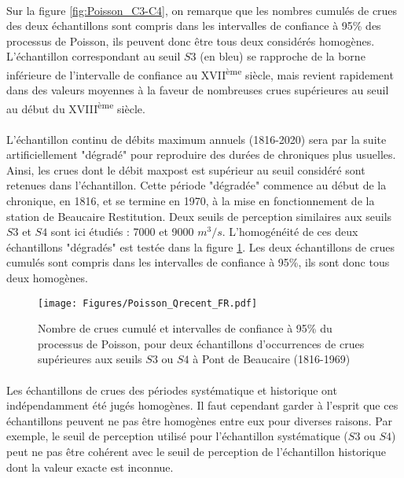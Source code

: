 \documentclass[11pt]{article}
\begin{document}
	\paragraph{} Sur la figure \ref{fig:Poisson_C3-C4}, on remarque que les nombres cumulés de crues des deux échantillons sont compris dans les intervalles de confiance à 95\% des processus de Poisson, ils peuvent donc être tous deux considérés homogènes. L'échantillon correspondant au seuil $S3$ (en bleu) se rapproche de la borne inférieure de l'intervalle de confiance au XVII\textsuperscript{ème} siècle, mais revient rapidement dans des valeurs moyennes à la faveur de nombreuses crues supérieures au seuil au début du XVIII\textsuperscript{ème} siècle. 
	
	\paragraph{} L'échantillon continu de débits maximum annuels (1816-2020) sera par la suite artificiellement "dégradé" pour reproduire des durées de chroniques plus usuelles. Ainsi, les crues dont le débit maxpost est supérieur au seuil considéré sont retenues dans l'échantillon. Cette période "dégradée" commence au début de la chronique, en 1816, et se termine en 1970, à la mise en fonctionnement de la station de Beaucaire Restitution. Deux seuils de perception similaires aux seuils $S3$ et $S4$ sont ici étudiés : 7000 et 9000 $m^3/s$. L'homogénéité de ces deux échantillons "dégradés" est testée dans la figure \ref{fig:Poisson_Recent}. Les deux échantillons de crues cumulés sont compris dans les intervalles de confiance à 95\%, ils sont donc tous deux homogènes. 
	
	\begin{figure}[h]
		\centering
		\texttt{[image: Figures/Poisson\_Qrecent\_FR.pdf]}	
		\caption{Nombre de crues cumulé et intervalles de confiance à 95\% du processus de 						Poisson, pour deux échantillons d'occurrences de crues supérieures aux seuils $S3$ ou $S4$ à Pont de Beaucaire 							(1816-1969) }
		\label{fig:Poisson_Recent}
	\end{figure}
	
	
	\paragraph{} Les échantillons de crues des périodes systématique et historique ont indépendamment été jugés homogènes. Il faut cependant garder à l'esprit que ces échantillons peuvent ne pas être homogènes entre eux pour diverses raisons. Par exemple, le seuil de perception utilisé pour l'échantillon systématique ($S3$ ou $S4$) peut ne pas être cohérent avec le seuil de perception de l'échantillon historique dont la valeur exacte est inconnue. 		
		
\end{document}
